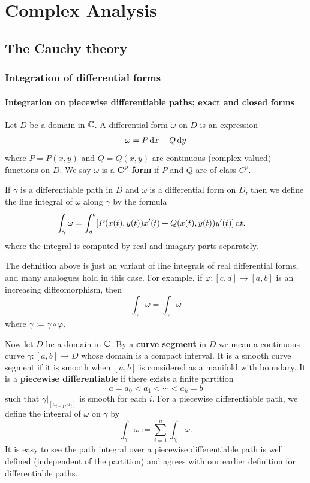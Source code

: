 \chapter{Complex Analysis}
\section{The Cauchy theory}
\subsection{Integration of differential forms}
\subsubsection{Integration on piecewise differentiable paths; exact and closed forms}
\begin{definition}
Let $D$ be a domain in $\mathbb{C}$. A differential form $\omega$ on $D$ is an expression
\[\omega=P\mathop{}\!\mathrm{d} x+Q\mathop{}\!\mathrm{d} y\]
where $P=P(x,y)$ and $Q=Q(x,y)$ are continuous (complex-valued) functions on $D$. We say $\omega$ is a \textbf{$\bm{C^p}$ form} if $P$ and $Q$ are of class $C^p$.\par
If $\gamma$ is a differentiable path in $D$ and $\omega$ is a differential form on $D$, then we define the line integral of $\omega$ along $\gamma$ by the formula
\begin{align*}
\int_{\gamma}\omega&=\int_{a}^{b}[P(x(t),y(t))x'(t)+Q(x(t),y(t))y'(t)]\mathop{}\!\mathrm{d} t.
\end{align*}
where the integral is computed by real and imagary parts separately.
\end{definition}
The definition above is just an variant of line integrals of real differential forms, and many analogues hold in this case. For example, if $\varphi:[c,d]\to[a,b]$ is an increasing diffeomorphism, then
\[\int_{\gamma}\omega=\int_{\widetilde{\gamma}}\omega\]
where $\widetilde{\gamma}:=\gamma\circ\varphi$.\par
Now let $D$ be a domain in $\mathbb{C}$. By a \textbf{curve segment} in $D$ we mean a continuous curve $\gamma:[a,b]\to D$ whose domain is a compact interval. It is a smooth curve segment if it is smooth when $[a,b]$ is considered as a manifold with boundary. It is a \textbf{piecewise differentiable} if there exists a finite partition 
\[a=a_0<a_1<\cdots<a_k=b\]
such that $\gamma|_{[a_{i-1},a_i]}$ is smooth for each $i$. For a piecewise differentiable path, we define the integral of $\omega$ on $\gamma$ by
\[\int_{\gamma}\omega:=\sum_{i=1}^{n}\int_{\gamma_i}\omega.\]
It is easy to see the path integral over a piecewise differentiable path is well defined (independent of the partition) and agrees with our earlier definition for differentiable paths.
